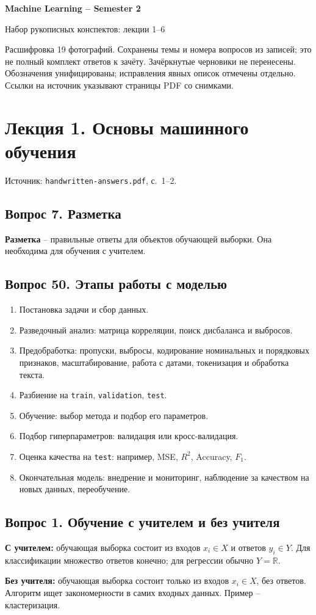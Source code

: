 \documentclass[11pt,a4paper]{article}
\newcommand{\source}[1]{{\small\color{muted}Источник: \texttt{handwritten-answers.pdf}, с.~#1.}\par}
\newcommand{\question}[2]{\subsection{Вопрос #1. #2}}
\newcommand{\code}[1]{\texttt{#1}}
\begin{document}
\begin{center}
{\LARGE\sffamily\bfseries Machine Learning -- Semester 2}\par
{\large Набор рукописных конспектов: лекции 1--6}
\end{center}
\vspace{2pt}
{\small Расшифровка 19 фотографий. Сохранены темы и номера вопросов из записей;
это не полный комплект ответов к зачёту. Зачёркнутые черновики не перенесены.
Обозначения унифицированы; исправления явных описок отмечены отдельно.
Ссылки на источник указывают страницы PDF со снимками.}
\vspace{10pt}

\section{Лекция 1. Основы машинного обучения}
\source{1--2}

\question{7}{Разметка}
\textbf{Разметка} -- правильные ответы для объектов обучающей выборки.
Она необходима для обучения с учителем.

\question{50}{Этапы работы с моделью}
\begin{enumerate}
\item Постановка задачи и сбор данных.
\item Разведочный анализ: матрица корреляции, поиск дисбаланса и выбросов.
\item Предобработка: пропуски, выбросы, кодирование номинальных и порядковых
признаков, масштабирование, работа с датами, токенизация и обработка текста.
\item Разбиение на \code{train}, \code{validation}, \code{test}.
\item Обучение: выбор метода и подбор его параметров.
\item Подбор гиперпараметров: валидация или кросс-валидация.
\item Оценка качества на \code{test}: например, MSE, $R^2$, Accuracy, $F_1$.
\item Окончательная модель: внедрение и мониторинг, наблюдение за качеством
на новых данных, переобучение.
\end{enumerate}

\question{1}{Обучение с учителем и без учителя}
\textbf{С учителем:} обучающая выборка состоит из входов $x_i\in X$
и ответов $y_i\in Y$. Для классификации множество ответов конечно;
для регрессии обычно $Y=\mathbb R$.

\textbf{Без учителя:} обучающая выборка состоит только из входов $x_i\in X$,
без ответов. Алгоритм ищет закономерности в самих входных данных.
Пример -- кластеризация.
\end{document}
